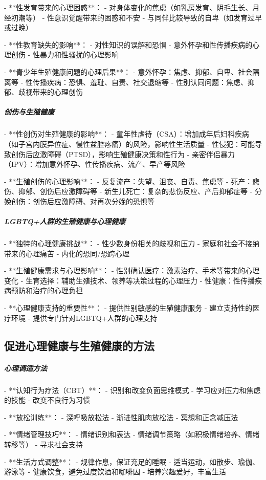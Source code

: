 \begin{enumerate}
- **性发育带来的心理困惑**：
  - 对身体变化的焦虑（如乳房发育、阴毛生长、月经初潮等）
  - 性意识觉醒带来的困惑和不安
  - 与同伴比较导致的自卑（如发育过早或过晚）

- **性教育缺失的影响**：
  - 对性知识的误解和恐惧
  - 意外怀孕和性传播疾病的心理创伤
  - 性暴力和性骚扰的心理影响

- **青少年生殖健康问题的心理后果**：
  - 意外怀孕：焦虑、抑郁、自卑、社会隔离等
  - 性传播疾病：恐惧、羞耻、自责、社交退缩等
  - 性别认同问题：焦虑、抑郁、歧视带来的心理创伤

\subparagraph{创伤与生殖健康}

- **性创伤对生殖健康的影响**：
  - 童年性虐待（CSA）：增加成年后妇科疾病（如子宫内膜异位症、慢性盆腔疼痛）的风险，影响性生活质量
  - 性侵犯：可能导致创伤后应激障碍（PTSD），影响生殖健康决策和性行为
  - 亲密伴侣暴力（IPV）：增加意外怀孕、性传播疾病、流产、早产等风险

- **生殖创伤的心理影响**：
  - 反复流产：失望、沮丧、自责、焦虑等
  - 死产：悲伤、抑郁、创伤后应激障碍等
  - 新生儿死亡：复杂的悲伤反应、产后抑郁症等
  - 分娩创伤：创伤后应激障碍、对再次分娩的恐惧等

\subparagraph{LGBTQ+人群的生殖健康与心理健康}

- **独特的心理健康挑战**：
  - 性少数身份相关的歧视和压力
  - 家庭和社会不接纳带来的心理痛苦
  - 内化的恐同/恐跨心理

- **生殖健康需求与心理影响**：
  - 性别确认医疗：激素治疗、手术等带来的心理变化
  - 生育选择：辅助生殖技术、领养等决策过程的心理压力
  - 性健康：性传播疾病预防和治疗的心理负担

- **心理健康支持的重要性**：
  - 提供性别敏感的生殖健康服务
  - 建立支持性的医疗环境
  - 提供专门针对LGBTQ+人群的心理支持

\subsection{促进心理健康与生殖健康的方法}

\subparagraph{心理调适方法}

- **认知行为疗法（CBT）**：
  - 识别和改变负面思维模式
  - 学习应对压力和焦虑的技能
  - 改变不良行为习惯

- **放松训练**：
  - 深呼吸放松法
  - 渐进性肌肉放松法
  - 冥想和正念减压法

- **情绪管理技巧**：
  - 情绪识别和表达
  - 情绪调节策略（如积极情绪培养、情绪转移等）
  - 寻求社会支持

- **生活方式调整**：
  - 规律作息，保证充足的睡眠
  - 适当运动，如散步、瑜伽、游泳等
  - 健康饮食，避免过度饮酒和咖啡因
  - 培养兴趣爱好，丰富生活


\end{enumerate}
